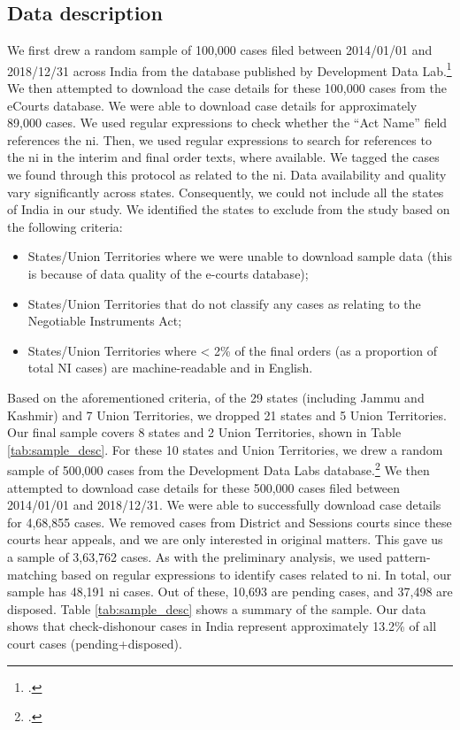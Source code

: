\subsection{Data description} \label{sec:data-description}

We first drew a random sample of 100,000 cases filed between 2014/01/01 and 2018/12/31 across India from the database published by Development Data Lab.\footcite{devdatalabs2021_eCourtsData} We then attempted to download the case details for these 100,000 cases from the eCourts database. We were able to download case details for approximately 89,000 cases. We used regular expressions to check whether the ``Act Name'' field references the \gls{ni}. Then, we used regular expressions to search for references to the \gls{ni} in the interim and final order texts, where available. We tagged the cases we found through this protocol as related to the \gls{ni}. Data availability and quality vary significantly across states. Consequently, we could not include all the states of India in our study. We identified the states to exclude from the study based on the following criteria:

\begin{itemize}
\item States/Union Territories where we were unable to download sample data (this is because of data quality of the e-courts database);
\item States/Union Territories that do not classify any cases as relating to the Negotiable Instruments Act;
\item States/Union Territories where < 2\% of the final orders (as a proportion of total NI cases) are machine-readable and in English.
\end{itemize}

Based on the aforementioned criteria, of the 29 states (including Jammu and Kashmir) and 7 Union Territories, we dropped 21 states and 5 Union Territories. Our final sample covers 8 states and 2 Union Territories, shown in Table \ref{tab:sample_desc}. For these 10 states and Union Territories, we drew a random sample of 500,000 cases from the Development Data Labs database.\footcite{devdatalabs2021_eCourtsData} We then attempted to download case details for these 500,000 cases filed between 2014/01/01 and 2018/12/31. We were able to successfully download case details for 4,68,855 cases. We removed cases from District and Sessions courts since these courts hear appeals, and we are only interested in original matters. This gave us a sample of 3,63,762 cases. As with the preliminary analysis, we used pattern-matching based on regular expressions to identify cases related to \gls{ni}. In total, our sample has 48,191 \gls{ni} cases. Out of these, 10,693 are pending cases, and 37,498 are disposed. Table \ref{tab:sample_desc} shows a summary of the sample. Our data shows that check-dishonour cases in India represent approximately 13.2\% of all court cases (pending+disposed).

